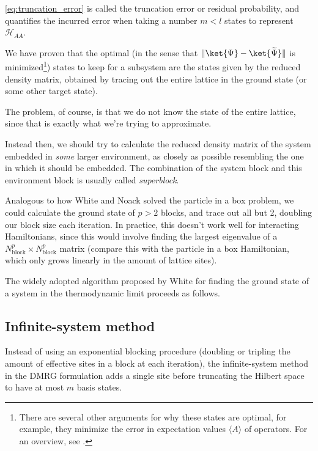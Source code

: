\autoref{eq:truncation_error} is called the truncation error or residual
probability, and quantifies the incurred error when taking a number $m < l$ states to
represent $\mathcal{H}_{AA}$.

We have proven that the optimal (in the sense that $\Vert \ket{\Psi}
- \ket{\widetilde{\Psi}} \Vert$ is minimized\footnote{There are several other
arguments for why these states are optimal, for example, they minimize the
error in expectation values $\langle A \rangle$ of operators. For an overview,
see \cite{schollwock2005density}.}) states to keep for a subsystem are the
states given by the reduced density matrix, obtained by tracing out the entire
lattice in the ground state (or some other target state).

The problem, of
course, is that we do not know the state of the entire lattice, since that is
exactly what we're trying to approximate.

Instead then, we should try to calculate the reduced density matrix of the
system embedded in \textit{some} larger environment, as closely as possible
resembling the one in which it should be embedded.  The combination of the
system block and this environment block is usually called \textit{superblock}.

Analogous to how White and Noack solved the particle in a box problem, we could
calculate the ground state of $p > 2$ blocks,
and trace out all but 2, doubling our block size each iteration. In
practice, this doesn't work well for interacting Hamiltonians, since this
would involve finding the largest eigenvalue of a $N_{\text{block}}^p
\times N_{\text{block}}^p$ matrix (compare this with the particle in a box
Hamiltonian, which only grows linearly in the amount of lattice sites).

The widely adopted algorithm proposed by White \cite{white1993density} for
finding the ground state of a system in the thermodynamic limit proceeds
as follows.

\subsection{Infinite-system method}

 
Instead of using an exponential blocking procedure (doubling or tripling the
amount of effective sites in a block at each iteration), the infinite-system
method in the DMRG formulation adds a single site before truncating the Hilbert
space to have at most $m$ basis states.

